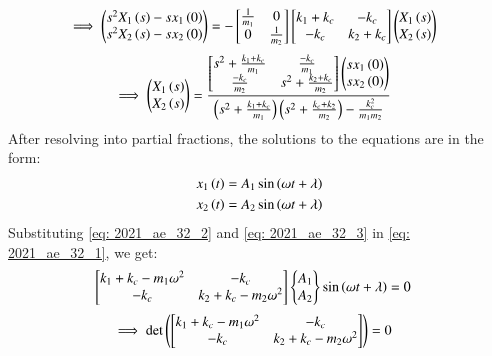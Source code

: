 \documentclass[journal,12pt,twocolumn]{IEEEtran}
\theoremstyle{remark}
\begin{document}
\newpage
\begin{align}
\implies \begin{pmatrix}
s^2 X_1\left(s\right)-sx_1\left(0\right)\\
s^2 X_2\left(s\right)-sx_2\left(0\right)
\end{pmatrix} &=-
\begin{bmatrix}
\frac{1}{m_1}&0\\
0&\frac{1}{m_2}\end{bmatrix}
\begin{bmatrix}
k_1+k_c&-k_c\\
-k_c&k_2+k_c\end{bmatrix}
\begin{pmatrix}
X_1\left(s\right)\\
X_2\left(s\right)
\end{pmatrix}
\end{align}
\begin{align}
\implies  \begin{pmatrix}
X_1\left(s\right)\\
X_2\left(s\right)
\end{pmatrix} &=
\frac{\begin{bmatrix}
s^2+\frac{k_1+k_c}{m_1}&\frac{-k_c}{m_1}\\
\frac{-k_c}{m_2}&s^2+\frac{k_2+k_c}{m_2}\end{bmatrix}
\begin{pmatrix}
sx_1\left(0\right)\\
sx_2\left(0\right)
\end{pmatrix}}
{\left(s^2+\frac{k_1+k_c}{m_1}\right)\left(s^2+\frac{k_c+k_2}{m_2}\right)-\frac{k_c^2}{m_1m_2}}
\end{align}
After resolving into partial fractions, the solutions to the equations are in the form:
\begin{align}
x_1\left(t\right) &= A_1\sin{\ensuremath{\left(\omega t+ \lambda\right)}} \label{eq: 2021_ae_32_2}\\
x_2\left(t\right) &= A_2\sin{\ensuremath{\left(\omega t+ \lambda\right)}} \label{eq: 2021_ae_32_3}
\end{align}
Substituting \eqref{eq: 2021_ae_32_2} and \eqref{eq: 2021_ae_32_3} in \eqref{eq: 2021_ae_32_1}, we get:
\begin{align}
\begin{bmatrix}
k_1+k_c- m_1\omega^2&-k_c\\
-k_c&k_2+k_c-m_2\omega^2\end{bmatrix}
\begin{Bmatrix}
A_1\\
A_2
\end{Bmatrix}
\sin{\ensuremath{\left(\omega t+ \lambda\right)}} &=0\label{eq: 2021_ae_32_4}
\end{align}
\begin{align}
\implies \det\left(\begin{bmatrix}
k_1+k_c- m_1\omega ^2&-k_c\\
-k_c&k_2+k_c-m_2\omega ^2\end{bmatrix}\right) &=0 \label{eq: 2021_ae_32_5}
\end{align}
\end{document}
